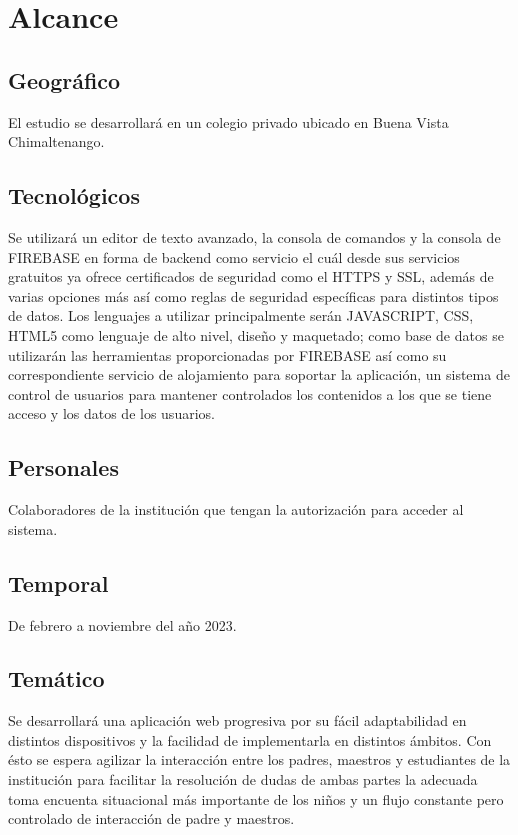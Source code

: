 \section{Alcance}
\subsection{Geográfico}
\hspace{1.47cm}El estudio se desarrollará en un colegio privado ubicado en Buena Vista Chimaltenango.
\subsection{Tecnológicos}
\hspace{1.47cm}Se utilizará un editor de texto avanzado, la consola de comandos y la consola de FIREBASE en forma de backend como servicio el cuál desde sus servicios gratuitos ya ofrece certificados de seguridad como el HTTPS y SSL, además de varias opciones más así como reglas de seguridad específicas para distintos tipos de datos. Los lenguajes a utilizar principalmente serán JAVASCRIPT, CSS, HTML5 como lenguaje de alto nivel, diseño y maquetado; como base de datos se utilizarán las herramientas proporcionadas por FIREBASE así como su correspondiente servicio de alojamiento para soportar la aplicación, un sistema de control de usuarios para mantener controlados los contenidos a los que se tiene acceso y los datos de los usuarios.
\subsection{Personales}
\hspace{1.47cm}Colaboradores de la institución que tengan la autorización para acceder al sistema.
\subsection{Temporal}
\hspace{1.47cm}De febrero a noviembre del año 2023.
\subsection{Temático}
\hspace{1.47cm}Se desarrollará una aplicación web progresiva por su fácil adaptabilidad en distintos dispositivos y la facilidad de implementarla en distintos ámbitos. Con ésto se espera agilizar la interacción entre los padres, maestros y estudiantes de la institución para facilitar la resolución de dudas de ambas partes la adecuada toma encuenta situacional más importante de los niños y un flujo constante pero controlado de interacción de padre y maestros.